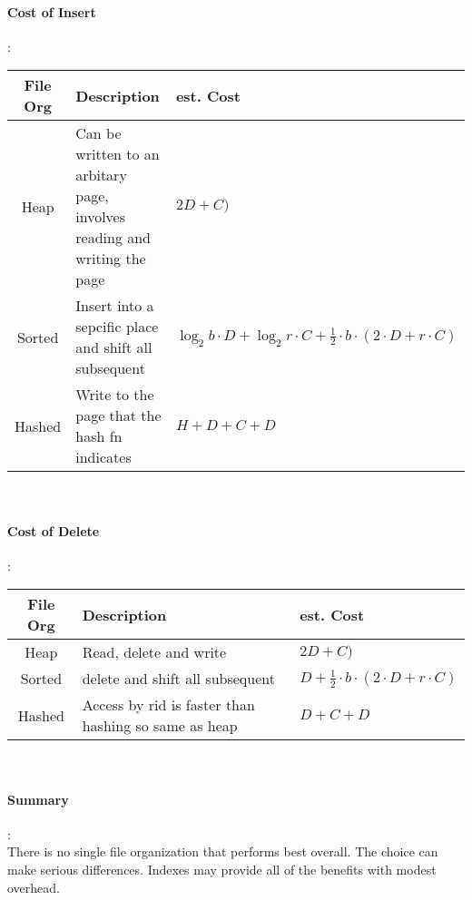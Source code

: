 \paragraph{Cost of Insert}:  \\ 
\begin{tabular}{|c|p{3cm}|p{5cm}|} \hline
     File Org & Description & est. Cost \\ \hline
     Heap & Can be written to an arbitary page, involves reading and writing the page & $2D + C)$ \\ \hline
     Sorted & Insert into a sepcific place and shift all subsequent  & $ \log_2 b \cdot D + \log_2 r \cdot C + \frac{1}{2} \cdot b \cdot (2 \cdot D + r \cdot C)$ \\ \hline
     Hashed & Write to the page that the hash fn indicates  & $ H+ D + C + D$ \\ \hline
\end{tabular} \\

\paragraph{Cost of Delete}:  \\ 
\begin{tabular}{|c|p{3cm}|p{5cm}|} \hline
     File Org & Description & est. Cost \\ \hline
     Heap & Read, delete and write & $2D + C)$ \\ \hline
     Sorted & delete and shift all subsequent  & $ D + \frac{1}{2} \cdot b \cdot (2 \cdot D + r \cdot C)$ \\ \hline
     Hashed & Access by rid is faster than hashing so same as heap & $  D + C + D$ \\ \hline
\end{tabular} \\

\paragraph{Summary}: \\
There is no single file organization that performs best overall. The choice can make serious differences. Indexes may provide all of the benefits with modest overhead.
